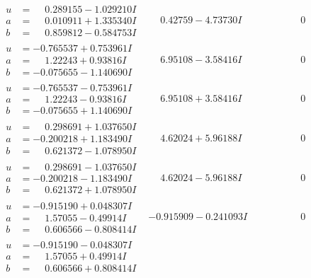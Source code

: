 \documentclass[1p]{elsarticle_modified}
\theoremstyle{definition}
\begin{document}
$$\begin{array}{c|c|c}
\begin{aligned}
u &= \phantom{-}0.289155 - 1.029210 I \\
a &= \phantom{-}0.010911 + 1.335340 I \\
b &= \phantom{-}0.859812 - 0.584753 I\end{aligned}
 & \phantom{-}0.42759 - 4.73730 I & \phantom{-0.000000 } 0 \\ \hline\begin{aligned}
u &= -0.765537 + 0.753961 I \\
a &= \phantom{-}1.22243 + 0.93816 I \\
b &= -0.075655 - 1.140690 I\end{aligned}
 & \phantom{-}6.95108 - 3.58416 I & \phantom{-0.000000 } 0 \\ \hline\begin{aligned}
u &= -0.765537 - 0.753961 I \\
a &= \phantom{-}1.22243 - 0.93816 I \\
b &= -0.075655 + 1.140690 I\end{aligned}
 & \phantom{-}6.95108 + 3.58416 I & \phantom{-0.000000 } 0 \\ \hline\begin{aligned}
u &= \phantom{-}0.298691 + 1.037650 I \\
a &= -0.200218 + 1.183490 I \\
b &= \phantom{-}0.621372 - 1.078950 I\end{aligned}
 & \phantom{-}4.62024 + 5.96188 I & \phantom{-0.000000 } 0 \\ \hline\begin{aligned}
u &= \phantom{-}0.298691 - 1.037650 I \\
a &= -0.200218 - 1.183490 I \\
b &= \phantom{-}0.621372 + 1.078950 I\end{aligned}
 & \phantom{-}4.62024 - 5.96188 I & \phantom{-0.000000 } 0 \\ \hline\begin{aligned}
u &= -0.915190 + 0.048307 I \\
a &= \phantom{-}1.57055 - 0.49914 I \\
b &= \phantom{-}0.606566 - 0.808414 I\end{aligned}
 & -0.915909 - 0.241093 I & \phantom{-0.000000 } 0 \\ \hline\begin{aligned}
u &= -0.915190 - 0.048307 I \\
a &= \phantom{-}1.57055 + 0.49914 I \\
b &= \phantom{-}0.606566 + 0.808414 I\end{aligned}

\end{array}$$
\end{document}

